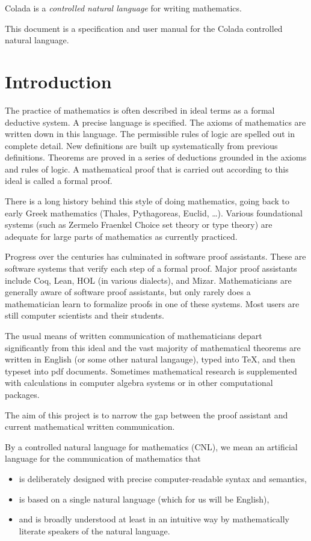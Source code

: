 Colada is a \emph{controlled natural language} for writing mathematics.

This document is a specification and user manual for the Colada controlled natural language.

\section{Introduction}

The practice of mathematics is often described in ideal terms as a
formal deductive system.  A precise language is specified.  The axioms
of mathematics are written down in this language.  The permissible
rules of logic are spelled out in complete detail. New definitions are
built up systematically from previous definitions.  Theorems are
proved in a series of deductions grounded in the axioms and rules of
logic.  A mathematical proof that is carried out according to this
ideal is called a formal proof.  


There is a long history behind this style of doing mathematics, going
back to early Greek mathematics (Thales, Pythagoreas, Euclid, \ldots).
Various foundational systems (such as Zermelo Fraenkel Choice set
theory or type theory) are adequate for large parts of mathematics as
currently practiced.

Progress over the centuries has culminated in software proof
assistants.  These are software systems that verify each step of a
formal proof.  Major proof assistants include Coq, Lean, HOL (in
various dialects), and Mizar.  Mathematicians are generally aware
of software proof assistants, but only rarely does a mathematician
learn to formalize proofs in one of these
systems.  Most users are still computer scientists and their students.


The usual means of written communication of mathematicians depart
significantly from this ideal and the vast majority of mathematical
theorems are written in English (or some other natural langauge),
typed into \TeX, and then typeset into pdf documents.  Sometimes mathematical research
is supplemented with calculations in computer algebra systems or
in other computational packages.

The aim of this project is to narrow the gap between the proof
assistant and current mathematical written communication.


By a controlled natural language for mathematics (CNL), we mean
an artificial language for the communication of mathematics that
\begin{itemize}
  \item is deliberately designed with precise computer-readable syntax
    and semantics,
    \item is based on a single natural language (which
      for us will be English),
      \item and is broadly understood at least
in an intuitive way by mathematically literate speakers of
the natural language.
\end{itemize}




